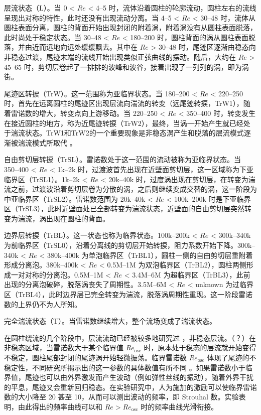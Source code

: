 层流状态（L）。当 0 < $Re$ < 4--5 时，流体沿着圆柱的轮廓流动，圆柱左右的流线呈现出对称的特性，此时还没有出现流动分离。当 4--5 < $Re$ < 30--48 时，流体从圆柱表面分离，圆柱的背面开始出现封闭的附着涡，附着涡没有从圆柱表面脱落，此时尚处于稳定状态。当 30--48 < $Re$ < 180--200 时，圆柱背面的涡从圆柱表面脱落，并由近而远地向远处缓缓飘去。其中在 $Re$ > 30--48 时，尾迹区逐渐由稳态向非稳态过渡，尾迹末端的流线开始出现类似正弦曲线的摆动。随后，大约在 $Re$ > 45--65 时，剪切层卷起了一排排的波峰和波谷，接着出现了一列列的涡，即为涡街。

尾迹区转捩（TrW）。这一范围称为亚临界状态。当 180--200 < $Re$ < 220--250 时，首先在远离圆柱的尾迹区出现层流向湍流的转变（远尾迹转捩，TrW1），随着雷诺数的增大，转变点向上游移动。当 220--250 < $Re$ < 350--400 时，转变发生在接近圆柱的地方，称为近尾迹转捩（TrW2），最终，当涡一开始产生就已经处于湍流状态。TrW1和TrW2的一个重要现象是非稳态涡产生和脱落的层流模式逐渐被湍流模式所取代 \cite{zdravkovich1997flow}。

自由剪切层转捩（TrSL）。雷诺数处于这一范围的流动被称为亚临界状态。当 350--400 < $Re$ < 1k--2k 时，过渡波首先出现在近壁面剪切层，这一区域称为下亚临界区（TrSL1）。1k--2k < $Re$ < 20k--40k 时，过度涡出现在剪切层，在转变为湍流之前，过渡波沿着剪切层卷为分散的涡，之后则继续变成交替的涡，这一阶段为中亚临界区（TrSL2）。雷诺数范围为 20k--40k < $Re$ < 100k--200k 时是下亚临界区（TrSL3），此时近壁面处已全部转变为湍流状态，近壁面的自由剪切层突然转变为湍流，涡出现在圆柱的背面。

边界层转捩（TrBL）。这一状态也称为临界状态。100k--200k < $Re$ < 300k--340k 为前临界区（TrSL0），沿着分离线的剪切层开始转捩，阻力系数开始下降。300k--340k < $Re$ < 380k--400k 为单泡临界区（TrBL1），圆柱一侧的自由剪切层重附着形成分离泡。380k--400k < $Re$ < 0.5M--1M 为双泡临界区（TrBL2），圆柱两侧形成一对对称的分离泡。0.5M--1M < $Re$ < 3.4M--6M 为超临界区（TrBL3），此前出现的分离泡破碎，脱落涡丧失了周期性。3.5M--6M < $Re$ < unknown 为过临界区（TrBL4），此时边界层已完全转变为湍流，脱落涡周期性重现。这一阶段雷诺数的上界仍不为人所知。

完全湍流状态（T）。当雷诺数继续增大，整个流场变成了湍流状态。

在圆柱绕流的几个阶段中，层流流动已经被较多地研究过 \cite{}，非稳态层流。（？）在非稳态区域，当雷诺数大于某个临界值 $Re_\text{osc}$ 时，原本处于稳态的层流就开始变得不稳定，圆柱尾部封闭的尾迹涡开始轻微振荡。临界雷诺数 $Re_\text{osc}$ 体现了尾迹的不稳定性，不同研究所揭示出的这一参数的具体数值有所不同 \cite{zdravkovich1997flow}。如果雷诺数小于临界值，尾迹也可以由外界激发而产生波动（例如弹性丝线的振动），随着外界干扰的平息，尾迹又会重新回归稳态。在实验研究中，人为施加的激励可以使临界雷诺数的大小降至 20 甚至 10，从而可以测出波动的频率，即 Strouhal 数。实验表明，由此得出的频率曲线可以和 $Re>Re_\text{osc}$ 时的频率曲线光滑衔接。


